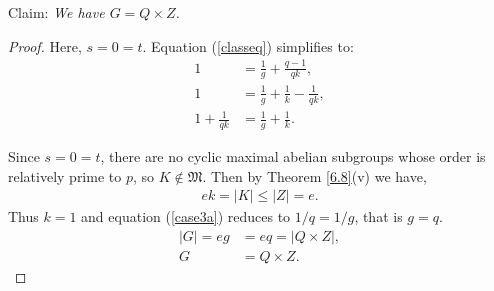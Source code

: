 \begin{theorem}
Claim: \textit{We have $G = Q \times Z$.}
\end{theorem}
\begin{proof} Here, $s = 0 = t$. Equation (\ref{classeq}) simplifies to:
\begin{align}\label{case3a} 1 &= \frac{1}{g} + \frac{q-1}{qk}, \nonumber
\\ 1 &= \frac{1}{g} + \frac{1}{k} - \frac{1}{qk}, \nonumber
\\ 1 + \frac{1}{qk} &= \frac{1}{g} + \frac{1}{k}.
\end{align}

Since $s = 0 = t$, there are no cyclic maximal abelian subgroups whose order is relatively prime to $p$, so $K \not \in \mathfrak{M}$. Then by Theorem \ref{6.8}(v) we have,
\begin{align*} ek = |K| \leq |Z| = e.
\end{align*} 
Thus $k = 1$ and equation (\ref{case3a}) reduces to $1/q = 1/g$, that is $g=q$.
\begin{align*} |G| =  eg &= eq = |Q \times Z|,
\\ G &= Q \times Z.
\end{align*}
\qedhere
\end{proof}


